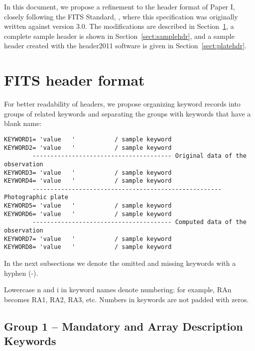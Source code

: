 \documentclass[11pt]{ivoa}
\begin{document}
In this document, we propose a refinement to the header format of Paper
I, closely following the FITS Standard, \citep{std:FITS}, where this
specification was originally written against version 3.0. The
modifications are described in Section~\ref{sect:format}, a complete
sample header is shown in Section~\ref{sect:samplehdr}, and a sample
header created with the header2011 software is given in
Section~\ref{sect:platehdr}.

\section{FITS header format}
\label{sect:format}

For better readability of headers, we propose organizing keyword records
into groups of related keywords and separating the groups with keywords
that have a blank name:

\begin{lstlisting}
KEYWORD1= 'value   '           / sample keyword
KEYWORD2= 'value   '           / sample keyword
        --------------------------------------- Original data of the observation
KEYWORD3= 'value   '           / sample keyword
KEYWORD4= 'value   '           / sample keyword
        ----------------------------------------------------- Photographic plate
KEYWORD5= 'value   '           / sample keyword
KEYWORD6= 'value   '           / sample keyword
        --------------------------------------- Computed data of the observation
KEYWORD7= 'value   '           / sample keyword
KEYWORD8= 'value   '           / sample keyword
\end{lstlisting}

In the next subsections we denote the omitted and missing keywords with
a hyphen (-).

Lowercase n and i in keyword names denote numbering: for example, RAn
becomes RA1, RA2, RA3, etc. Numbers in keywords are not padded with
zeros.

\subsection{Group 1 -- Mandatory and Array Description Keywords}
\end{document}
